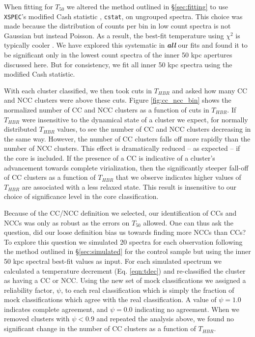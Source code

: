 \documentclass{emulateapj}
\begin{document}
When fitting for $T_{50}$ we altered the method outlined
in \S\ref{sec:fitting} to use {\tt XSPEC}'s modified Cash statistic
\citep{1979ApJ...228..939C}, {\tt cstat}, on ungrouped
spectra. This choice was made because the distribution of counts per
bin in low count spectra is not Gaussian but instead
Poisson. As a result, the best-fit temperature using $\chi^2$ is
typically cooler \citep{1989ApJ...342.1207N, 2007A&A...462..429B}. We
have explored this systematic in {\bfseries\em{all}} our fits and
found it to be significant only in the lowest count spectra of the
inner 50 kpc apertures discussed here. But for consistency, we fit all
inner 50 kpc spectra using the modified Cash statistic.

With each cluster classified, we then took cuts in $T_{HBR}$ 
and asked how many CC and NCC clusters were above these cuts. 
Figure \ref{fig:cc_ncc_bin} shows the normalized number of CC and NCC
clusters as a function of cuts in $T_{HBR}$. If $T_{HBR}$ were insensitive to
the dynamical state of a cluster we expect, for normally
distributed $T_{HBR}$ values, to see the number of CC and NCC clusters
decreasing in the same way. However, the number of CC clusters falls off
more rapidly than the number of NCC clusters. This effect
is dramatically reduced -- as expected -- if the core is included.
If the presence of a CC is indicative of a cluster's advancement
towards complete virialization, then the significantly steeper
fall-off of CC clusters as a function of $T_{HBR}$ that we observe indicates
higher values of $T_{HBR}$ are associated with a less relaxed state. This
result is insensitive to our choice of significance level in the core
classification.

Because of the CC/NCC definition we selected, our identification of
CCs and NCCs was only as robust as the errors on $T_{50}$ allowed. One can
thus ask the question, did our loose definition bias us towards
finding more NCCs than CCs? To explore this question we simulated 20
spectra for each observation following the method outlined in
\S\ref{sec:simulated} for the control sample but using the inner 50
kpc spectral best-fit values as input. For each simulated spectrum we
calculated a temperature decrement (Eq. \ref{eqn:tdec}) and
re-classified the cluster as having a CC or NCC. Using the new set of
mock classifications we assigned a reliability factor, $\psi$, to each
real classification which is simply the fraction of mock
classifications which agree with the real classification. A value of
$\psi = 1.0$ indicates complete agreement, and $\psi = 0.0$ indicating no
agreement. When we removed clusters with $\psi < 0.9$ and repeated the
analysis above, we found no significant change in the number of CC
clusters as a function of $T_{HBR}$.
\end{document}

